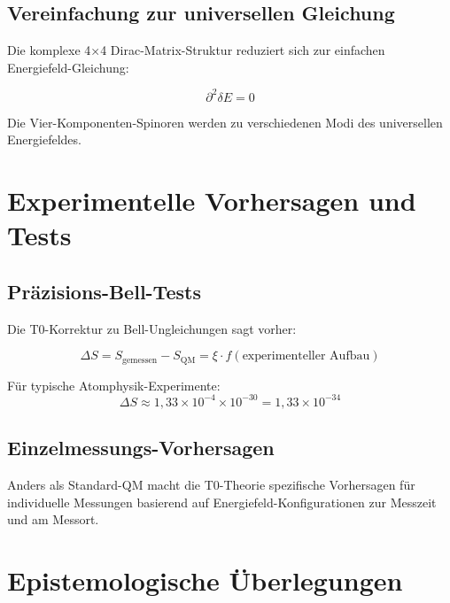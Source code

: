 \documentclass[12pt,a4paper]{report}
\begin{document}
\subsection{Vereinfachung zur universellen Gleichung}
\label{subsec:dirac_simplification}

Die komplexe 4×4 Dirac-Matrix-Struktur reduziert sich zur einfachen Energiefeld-Gleichung:

\begin{equation}
	\partial^2 \delta E = 0
\end{equation}

Die Vier-Komponenten-Spinoren werden zu verschiedenen Modi des universellen Energiefeldes.

\section{Experimentelle Vorhersagen und Tests}
\label{sec:experimental_predictions}

\subsection{Präzisions-Bell-Tests}
\label{subsec:precision_bell_tests}

Die T0-Korrektur zu Bell-Ungleichungen sagt vorher:

\begin{equation}
	\Delta S = S_{\text{gemessen}} - S_{\text{QM}} = \xi \cdot f(\text{experimenteller Aufbau})
\end{equation}

Für typische Atomphysik-Experimente:
\begin{equation}
	\Delta S \approx 1,33 \times 10^{-4} \times 10^{-30} = 1,33 \times 10^{-34}
\end{equation}

\subsection{Einzelmessungs-Vorhersagen}
\label{subsec:single_measurement_predictions}

Anders als Standard-QM macht die T0-Theorie spezifische Vorhersagen für individuelle Messungen basierend auf Energiefeld-Konfigurationen zur Messzeit und am Messort.

\section{Epistemologische Überlegungen}
\label{sec:epistemological}
\end{document}
